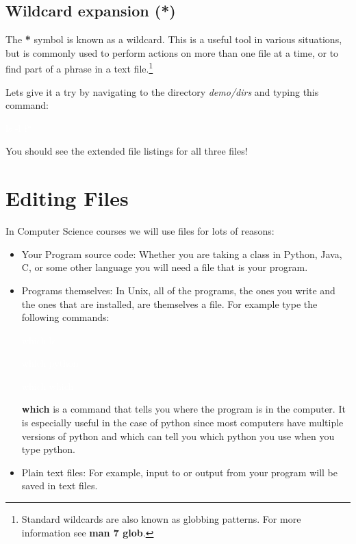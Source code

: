 \documentclass[oneside]{book}
\newcommand{\commandline}[1]{\begin{center} \colorbox{Dark}{\textcolor{white}{#1}} \end{center}}
\begin{document}
\subsection{Wildcard expansion (*)}
The \textbf{*} symbol is known as a wildcard. This is a useful tool in various situations, but is commonly used to perform actions on more than one file at a time, or to find part of a phrase in a text file.\footnote{Standard wildcards are also known as globbing patterns. For more information see \textbf{man 7 glob}.} 

Lets give it a try by navigating to the directory \textit{demo/dirs} and typing this command:
\commandline{ls -l f*}

You should see the extended file listings for all three files!

\section{Editing Files}
 In Computer Science courses we will use files for lots of reasons:
\begin{itemize}
	\item Your Program source code: Whether you are taking a class in Python, Java, C, or some other language you will need a file that is your program.
	\item Programs themselves: In Unix, all of the programs, the ones you write and the ones that are installed, are themselves a file. For example type the following commands:
		\commandline{which ls}
		\commandline{which python}
		\commandline{which which}
	\textbf{which} is a command that tells you where the program is in the computer. It is especially useful in the case of python since most computers have multiple versions of python and which can tell you which python you use when you type python.
	\item Plain text files: For example, input to or output from your program will be saved in text files. 
\end{itemize}
\end{document}
